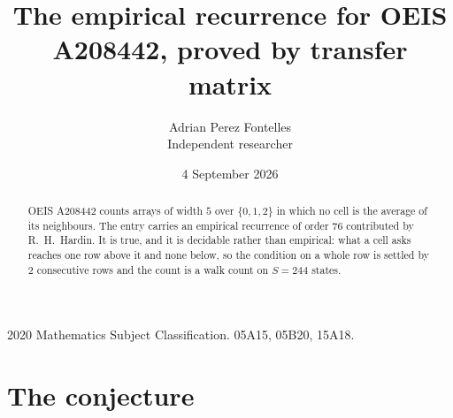 \documentclass[11pt,a4paper]{article}
\title{The empirical recurrence for OEIS A208442, proved by transfer matrix}
\author{Adrian Perez Fontelles\\ \small Independent researcher}
\date{4 September 2026}
\theoremstyle{plain}
\theoremstyle{definition}
\begin{document}
\maketitle

\begin{abstract}
OEIS A208442 counts arrays of width $5$ over $\{0,1,2\}$ in which no cell is the average of its neighbours. The entry carries an
empirical recurrence of order $76$ contributed by R.~H.~Hardin. It is true, and it is
decidable rather than empirical: what a cell asks reaches one row above
it and none below, so the condition on a whole row is settled by
$2$ consecutive rows and the count is a walk count on $S=244$ states.
\end{abstract}

\noindent\small 2020 Mathematics Subject Classification. 05A15, 05B20, 15A18.\normalsize

\section{The conjecture}
\end{document}

